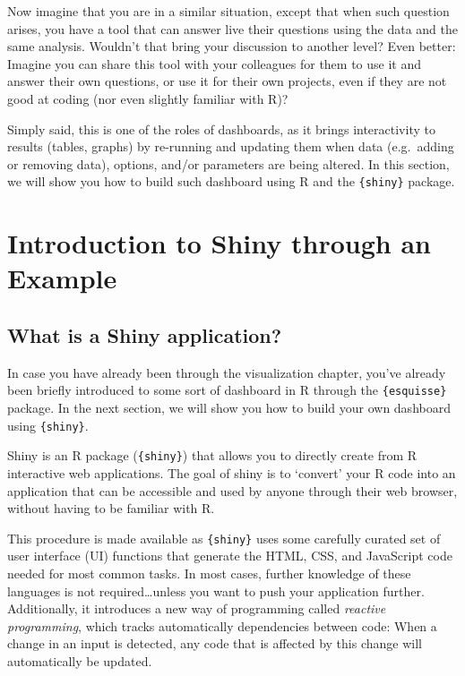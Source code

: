 \documentclass[
]{book}
\begin{document}
Now imagine that you are in a similar situation, except that when such question arises, you have a tool that can answer live their questions using the data and the same analysis. Wouldn't that bring your discussion to another level?
Even better: Imagine you can share this tool with your colleagues for them to use it and answer their own questions, or use it for their own projects, even if they are not good at coding (nor even slightly familiar with R)?

Simply said, this is one of the roles of dashboards, as it brings interactivity to results (tables, graphs) by re-running and updating them when data (e.g.~adding or removing data), options, and/or parameters are being altered.
In this section, we will show you how to build such dashboard using R and the \texttt{\{shiny\}} package.

\hypertarget{introduction-to-shiny-through-an-example}{%
\section{Introduction to Shiny through an Example}\label{introduction-to-shiny-through-an-example}}

\hypertarget{what-is-a-shiny-application}{%
\subsection{What is a Shiny application?}\label{what-is-a-shiny-application}}

In case you have already been through the visualization chapter, you've already been briefly introduced to some sort of dashboard in R through the \texttt{\{esquisse\}} package. In the next section, we will show you how to build your own dashboard using \texttt{\{shiny\}}.

Shiny is an R package (\texttt{\{shiny\}}) that allows you to directly create from R interactive web applications. The goal of shiny is to `convert' your R code into an application that can be accessible and used by anyone through their web browser, without having to be familiar with R.

This procedure is made available as \texttt{\{shiny\}} uses some carefully curated set of user interface (UI) functions that generate the HTML, CSS, and JavaScript code needed for most common tasks. In most cases, further knowledge of these languages is not required\ldots unless you want to push your application further. Additionally, it introduces a new way of programming called \emph{reactive programming}, which tracks automatically dependencies between code: When a change in an input is detected, any code that is affected by this change will automatically be updated.
\end{document}
